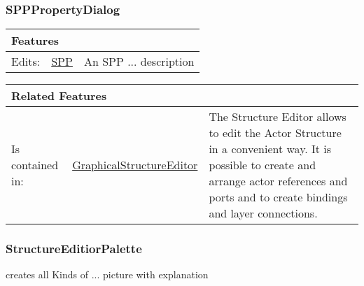 			
		
		\subsubsection{SPPPropertyDialog}
			\hypertarget{ref:SPPPropertyDialog}{}
			
			
			
			\vspace{\baselineskip}
			\begingroup
			\renewcommand{\arraystretch}{1.8} %
			\parbox{\textwidth}{
			\begin{longtable}{l l p{}}
				\multicolumn{2}{l}{\textbf{\large Features}} & \\
				\hline
			Edits: & \tabitem \hyperlink{ref:SPP}{SPP}  & An SPP ... description\\
			\hline
			\end{longtable}	
			}
			\endgroup
			\vspace{\baselineskip}
			
			\vspace{\baselineskip}
			\begingroup
			\renewcommand{\arraystretch}{1.8} %
			\parbox{\textwidth}{
			\begin{longtable}{l l p{}}
				\multicolumn{2}{l}{\textbf{\large Related Features}} & \\
				\hline
			Is contained in: & \tabitem \hyperlink{ref:GraphicalStructureEditor}{GraphicalStructureEditor}  & The Structure Editor allows to edit the Actor Structure in a convenient way. It is possible to create and arrange actor references and ports and to create bindings and layer connections.\\
			\hline
			\end{longtable}	
			}
			\endgroup
			\vspace{\baselineskip}
			
			
		
		\subsubsection{StructureEditiorPalette}
			\hypertarget{ref:StructureEditiorPalette}{}
			
			creates all Kinds of ...  picture with explanation
			
			
			
